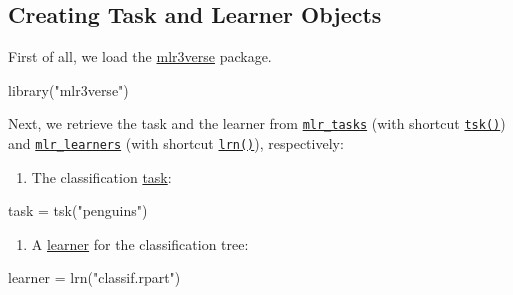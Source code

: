 \documentclass[
]{scrbook}
\newenvironment{Shaded}{\begin{snugshade}}{\end{snugshade}}
\newcommand{\FunctionTok}[1]{\textcolor[rgb]{0.00,0.00,0.00}{#1}}
\newcommand{\NormalTok}[1]{#1}
\newcommand{\OtherTok}[1]{\textcolor[rgb]{0.56,0.35,0.01}{#1}}
\newcommand{\StringTok}[1]{\textcolor[rgb]{0.31,0.60,0.02}{#1}}
\providecommand{\tightlist}{%
  \setlength{\itemsep}{0pt}\setlength{\parskip}{0pt}}
\renewenvironment{Shaded} {\begin{snugshade}\small} {\end{snugshade}}
\begin{document}
\hypertarget{train-predict-objects}{%
\subsection{Creating Task and Learner Objects}\label{train-predict-objects}}

First of all, we load the \href{https://mlr3verse.mlr-org.com}{mlr3verse} package.

\begin{Shaded}
\begin{Highlighting}[]
\FunctionTok{library}\NormalTok{(}\StringTok{"mlr3verse"}\NormalTok{)}
\end{Highlighting}
\end{Shaded}

Next, we retrieve the task and the learner from \href{https://mlr3.mlr-org.com/reference/mlr_tasks.html}{\texttt{mlr\_tasks}} (with shortcut \href{https://mlr3.mlr-org.com/reference/mlr_sugar.html}{\texttt{tsk()}}) and \href{https://mlr3.mlr-org.com/reference/mlr_learners.html}{\texttt{mlr\_learners}} (with shortcut \href{https://mlr3.mlr-org.com/reference/mlr_sugar.html}{\texttt{lrn()}}), respectively:

\begin{enumerate}
\def\labelenumi{\arabic{enumi}.}
\tightlist
\item
  The classification \protect\hyperlink{tasks}{task}:
\end{enumerate}

\begin{Shaded}
\begin{Highlighting}[]
\NormalTok{task }\OtherTok{=} \FunctionTok{tsk}\NormalTok{(}\StringTok{"penguins"}\NormalTok{)}
\end{Highlighting}
\end{Shaded}

\begin{enumerate}
\def\labelenumi{\arabic{enumi}.}
\setcounter{enumi}{1}
\tightlist
\item
  A \protect\hyperlink{learners}{learner} for the classification tree:
\end{enumerate}

\begin{Shaded}
\begin{Highlighting}[]
\NormalTok{learner }\OtherTok{=} \FunctionTok{lrn}\NormalTok{(}\StringTok{"classif.rpart"}\NormalTok{)}
\end{Highlighting}
\end{Shaded}
\end{document}
